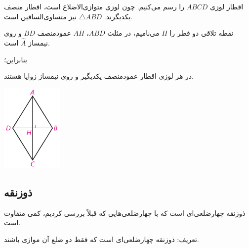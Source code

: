 \documentclass[12pt, a4paper]{book}
\begin{document}
\begin{minipage}{.8\textwidth}
	
	اقطار لوزی
	$ABCD$
	را رسم می‌کنیم. چون لوزی متوازی‌الاضلاع است، اقطار منصف یکدیگرند. 
	$
	\triangle ABD
	$
	نیز متساوی‌الساقین است.
	
	نقطه تلاقی دو قطر را
	$H$
	می‌نامیم، در مثلث
	$ABD$،
	$AH$
	عمودمنصف
	$BD$
	و روی نیمساز 
	$
	\widehat{A}
	$
	است.
	
	بنابراین؛

 در هر لوزی اقطار {\medium عمودمنصف} یکدیگیر و روی {\medium نیمساز} زوایا هستند.

\end{minipage}
\begin{minipage}{.2\textwidth}
	\begin{flushleft}
		\includegraphics[width=3cm]{"Shapes/Fasl - 3/Dars 1/2-3.1.pdf"}
	\end{flushleft}
\end{minipage}

\subsection{ذوزنقه}
ذوزنقه چهارضلعی‌ای است که با چهارضلعی‌هایی که قبلاً بررسی کردیم، کمی متفاوت است.

{\semibold تعریف:} ذوزنقه چهارضلعی‌ای است که فقط دو ضلع آن موازی باشند.
\end{document}
